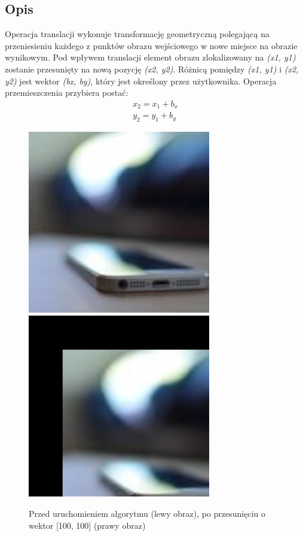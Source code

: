 \documentclass[a4paper,12pt]{book}
\begin{document}
\subsection*{Opis}
Operacja translacji wykonuje transformację geometryczną polegającą na przeniesieniu każdego z punktów obrazu wejściowego w nowe miejsce na obrazie wynikowym. Pod wpływem translacji element obrazu zlokalizowany na \textit{(x1, y1)} zostanie przesunięty na nową pozycję \textit{(x2, y2)}. Różnicą pomiędzy \textit{(x1, y1)} i \textit{(x2, y2)} jest wektor \textit{(bx, by)}, który jest określony przez użytkownika. 
\newline
Operacja przemieszczenia przybiera postać: 
\begin{gather}
	x_2 = x_1 + b_x \\
	y_2 = y_1 + b_y
\end{gather}
\begin{figure}[H]
	\caption{Przed uruchomieniem algorytmu (lewy obraz), po przesunięciu o wektor [100, 100] (prawy obraz)}
	\includegraphics[width=8cm, height=8cm]{phone-unmodified.jpg}
	\includegraphics[width=8cm, height=8cm]{phone-translate.png}
\end{figure}
\end{document}
